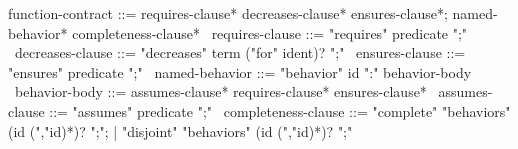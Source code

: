 \begin{syntax}
  function-contract ::= requires-clause* decreases-clause* ensures-clause*;
                        named-behavior* completeness-clause*
  \
  requires-clause ::= "requires" predicate ";"
  \
  decreases-clause ::= "decreases" term ("for" ident)? ";"
  \
  ensures-clause ::= "ensures" predicate ";"
  \
  named-behavior ::= "behavior" id ":" behavior-body
  \
  behavior-body ::= assumes-clause* requires-clause* ensures-clause*
  \
  assumes-clause ::= "assumes" predicate ";"
  \
  completeness-clause ::= "complete" "behaviors" (id (","id)*)? ";";
     | "disjoint" "behaviors" (id (","id)*)? ";"
\end{syntax}
